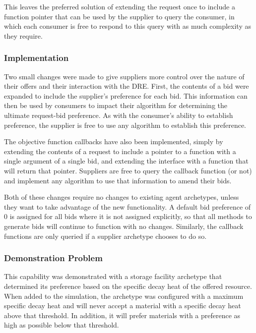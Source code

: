 This leaves the preferred solution of extending the request once to include a
function pointer that can be used by the supplier to query the consumer, in
which each consumer is free to respond to this query with as much complexity
as they require.


\subsubsection{Implementation}

Two small changes were made to give suppliers more control over the nature of
their offers and their interaction with the \gls{DRE}.  First, the contents of
a bid were expanded to include the supplier's preference for each bid.  This
information can then be used by consumers to impact their algorithm for
determining the ultimate request-bid preference.  As with the consumer's
ability to establish preference, the supplier is free to use any algorithm to
establish this preference.

The objective function callbacks have also been implemented, simply by
extending the contents of a request to include a pointer to a function with a
single argument of a single bid, and extending the interface with a function
that will return that pointer.  Suppliers are free to query the callback
function (or not) and implement any algorithm to use that information to amend
their bids.

Both of these changes require no changes to existing agent archetypes, unless
they want to take advantage of the new functionality.  A default bid
preference of 0 is assigned for all bids where it is not assigned explicitly,
so that all methods to generate bids will continue to function with no
changes.  Similarly, the callback functions are only queried if a supplier
archetype chooses to do so.


\subsubsection{Demonstration Problem}


This capability was demonstrated with a storage facility archetype that
determined its preference based on the specific decay heat of the offered
resource.  When added to the simulation, the archetype was configured with a
maximum specific decay heat and will never accept a material with a specific
decay heat above that threshold.  In addition, it will prefer materials with a
preference as high as possible below that threshold.


